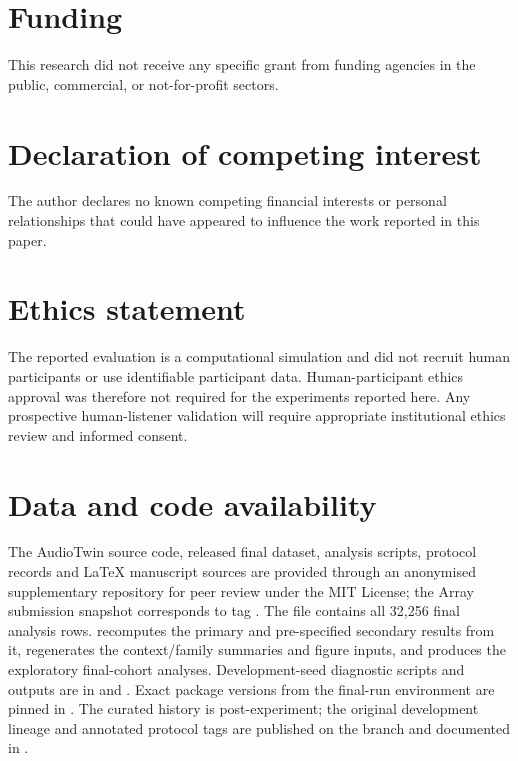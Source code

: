 \documentclass[preprint,12pt]{elsarticle}
\begin{document}
\section*{Funding}
This research did not receive any specific grant from funding agencies in the public, commercial, or not-for-profit sectors.

\section*{Declaration of competing interest}
The author declares no known competing financial interests or personal relationships that could have appeared to influence the work reported in this paper.

\section*{Ethics statement}
The reported evaluation is a computational simulation and did not recruit human participants or use identifiable participant data. Human-participant ethics approval was therefore not required for the experiments reported here. Any prospective human-listener validation will require appropriate institutional ethics review and informed consent.

\section*{Data and code availability}
The AudioTwin source code, released final dataset, analysis scripts, protocol records and LaTeX manuscript sources are provided through an anonymised supplementary repository for peer review under the MIT License; the Array submission snapshot corresponds to tag . The file  contains all 32,256 final analysis rows.  recomputes the primary and pre-specified secondary results from it,  regenerates the context/family summaries and figure inputs, and  produces the exploratory final-cohort analyses. Development-seed diagnostic scripts and outputs are in  and . Exact package versions from the final-run environment are pinned in . The curated  history is post-experiment; the original development lineage and annotated protocol tags are published on the  branch and documented in .
\end{document}
